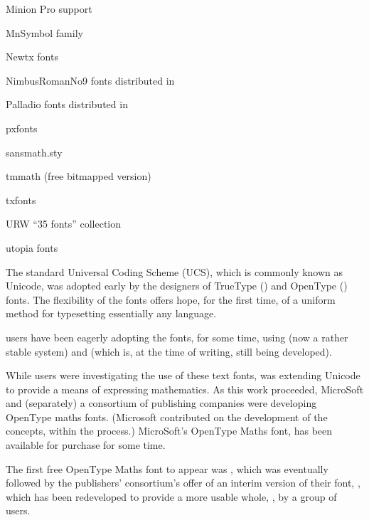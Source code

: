 \begin{ctanrefs}
\item[\nothtml{\normalfont}Minion Pro support]
\item[MnSymbol \nothtml{\normalfont}family]
\item[Newtx \nothtml{\normalfont}fonts]
\item[NimbusRomanNo9 fonts]distributed in 
\item[Palladio fonts]distributed in 
\item[pxfonts]
\item[sansmath.sty]
\item[tmmath \nothtml{\normalfont\itshape}(free bitmapped version)]%
\item[txfonts]
\item[\nothtml{\normalfont}URW ``35 fonts'' collection]
\item[utopia \nothtml{\normalfont}fonts]
\end{ctanrefs}


The  standard Universal Coding Scheme (UCS), which is
commonly known as Unicode, was adopted early by the designers of
TrueType () and OpenType () fonts.  The
flexibility of the fonts offers hope, for the first time, of a uniform
method for typesetting essentially any language.

\tex{} users have been eagerly adopting the fonts, for some time,
using \xetex{} (now a rather stable system) and \luatex{} (which is,
at the time of writing, still being developed).

While \tex{} users were investigating the use of these text fonts,
 was extending Unicode to provide a means of expressing
mathematics.  As this work proceeded, MicroSoft and (separately) a
consortium of publishing companies were developing OpenType maths
fonts.  (Microsoft contributed on the development of the concepts,
within the  process.)  MicroSoft's OpenType Maths font,
 has been available for purchase for some time.

The first free OpenType Maths font to appear was %
, which was eventually followed by
the publishers' consortium's offer of an interim version
of their font, , which has been
redeveloped to provide a more usable whole, , by a group
of \tex{} users.

